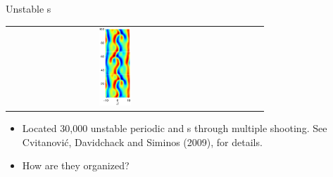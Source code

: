 \documentclass{beamer}
\begin{document}
\begin{frame}{Unstable \rpo s}
\begin{tabular}{ccccc}
\includegraphics[width=0.15\textwidth]{../../figs/ks22rpo066.8-00.00.eps}\\

\end{tabular}

\begin{itemize}
 \item Located 30,000 unstable periodic and \rpo s through multiple shooting. See 
	Cvitanovi{\'c}, Davidchack and Siminos (2009), for details.
 \item How are they organized?
\end{itemize}

 
\end{frame}
\end{document}
